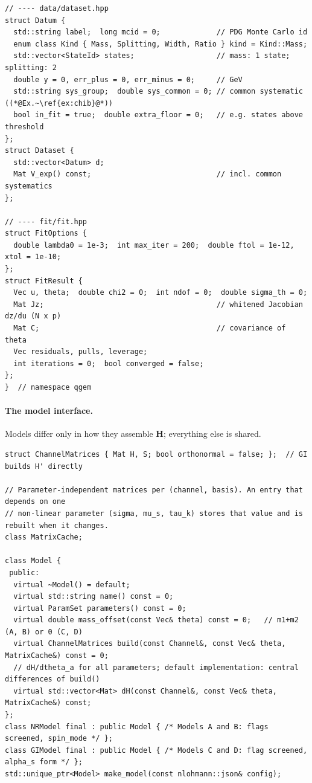 \documentclass[11pt,a4paper]{article}
\numberwithin{equation}{section}
\theoremstyle{definition}
\theoremstyle{plain}
\theoremstyle{remark}
\numberwithin{algorithm}{section}
\newcommand{\mH}{\mathbf H}
\begin{document}
\begin{lstlisting}[style=cpp]
// ---- data/dataset.hpp
struct Datum {
  std::string label;  long mcid = 0;             // PDG Monte Carlo id
  enum class Kind { Mass, Splitting, Width, Ratio } kind = Kind::Mass;
  std::vector<StateId> states;                   // mass: 1 state; splitting: 2
  double y = 0, err_plus = 0, err_minus = 0;     // GeV
  std::string sys_group;  double sys_common = 0; // common systematic ((*@Ex.~\ref{ex:chib}@*))
  bool in_fit = true;  double extra_floor = 0;   // e.g. states above threshold
};
struct Dataset {
  std::vector<Datum> d;
  Mat V_exp() const;                             // incl. common systematics
};

// ---- fit/fit.hpp
struct FitOptions {
  double lambda0 = 1e-3;  int max_iter = 200;  double ftol = 1e-12, xtol = 1e-10;
};
struct FitResult {
  Vec u, theta;  double chi2 = 0;  int ndof = 0;  double sigma_th = 0;
  Mat Jz;                                        // whitened Jacobian dz/du (N x p)
  Mat C;                                         // covariance of theta
  Vec residuals, pulls, leverage;
  int iterations = 0;  bool converged = false;
};
}  // namespace qgem
\end{lstlisting}

\paragraph{The model interface.} Models differ only in how they assemble $\mH$; everything else is shared.
\begin{lstlisting}[style=cpp]
struct ChannelMatrices { Mat H, S; bool orthonormal = false; };  // GI builds H' directly

// Parameter-independent matrices per (channel, basis). An entry that depends on one
// non-linear parameter (sigma, mu_s, tau_k) stores that value and is rebuilt when it changes.
class MatrixCache;

class Model {
 public:
  virtual ~Model() = default;
  virtual std::string name() const = 0;
  virtual ParamSet parameters() const = 0;
  virtual double mass_offset(const Vec& theta) const = 0;   // m1+m2 (A, B) or 0 (C, D)
  virtual ChannelMatrices build(const Channel&, const Vec& theta, MatrixCache&) const = 0;
  // dH/dtheta_a for all parameters; default implementation: central differences of build()
  virtual std::vector<Mat> dH(const Channel&, const Vec& theta, MatrixCache&) const;
};
class NRModel final : public Model { /* Models A and B: flags screened, spin_mode */ };
class GIModel final : public Model { /* Models C and D: flag screened, alpha_s form */ };
std::unique_ptr<Model> make_model(const nlohmann::json& config);
\end{lstlisting}
\end{document}
